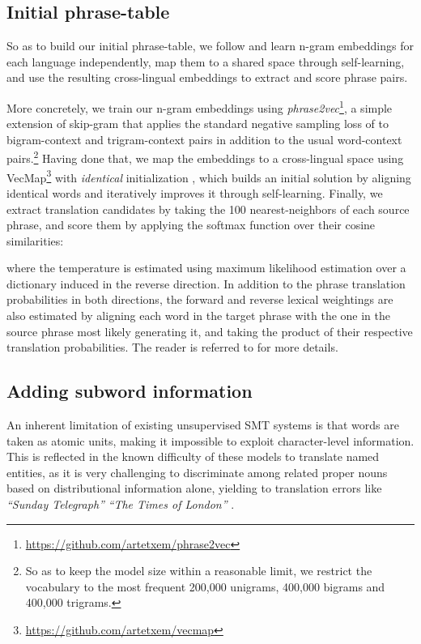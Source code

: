 \documentclass[11pt,a4paper]{article}
\begin{document}
\subsection{Initial phrase-table} \label{subsec:initial}

So as to build our initial phrase-table, we follow \citet{artetxe2018usmt} and learn n-gram embeddings for each language independently, map them to a shared space through self-learning, and use the resulting cross-lingual embeddings to extract and score phrase pairs.

More concretely, we train our n-gram embeddings using \textit{phrase2vec}\footnote{\url{https://github.com/artetxem/phrase2vec}}, a simple extension of skip-gram that applies the standard negative sampling loss of \citet{mikolov2013distributed} to bigram-context and trigram-context pairs in addition to the usual word-context pairs.\footnote{So as to keep the model size within a reasonable limit, we restrict the vocabulary to the most frequent 200,000 unigrams, 400,000 bigrams and 400,000 trigrams.} Having done that, we map the embeddings to a cross-lingual space using VecMap\footnote{\url{https://github.com/artetxem/vecmap}} with \textit{identical} initialization \citep{artetxe2018robust}, which builds an initial solution by aligning identical words and iteratively improves it through self-learning. Finally, we extract translation candidates by taking the 100 nearest-neighbors of each source phrase, and score them by applying the softmax function over their cosine similarities:

where the temperature  is estimated using maximum likelihood estimation over a dictionary induced in the reverse direction. In addition to the phrase translation probabilities in both directions, the forward and reverse lexical weightings are also estimated by aligning each word in the target phrase with the one in the source phrase most likely generating it, and taking the product of their respective translation probabilities. The reader is referred to \citet{artetxe2018usmt} for more details.

\subsection{Adding subword information} \label{subsec:subword}

An inherent limitation of existing unsupervised SMT systems is that words are taken as atomic units, making it impossible to exploit character-level information. This is reflected in the known difficulty of these models to translate named entities, as it is very challenging to discriminate among related proper nouns based on distributional information alone, yielding to translation errors like \textit{``Sunday Telegraph''}  \textit{``The Times of London''} \citep{artetxe2018usmt}.
\end{document}
